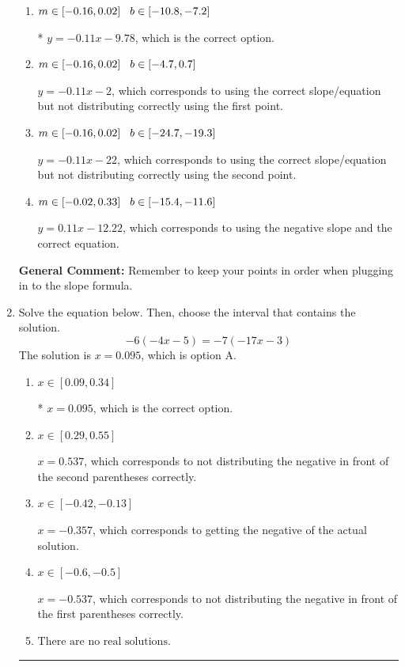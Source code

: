 \documentclass{extbook}[14pt]
\newcommand{\litem}[1]{\item #1

\rule{\textwidth}{0.4pt}}
\begin{document}
\begin{enumerate}
{\begin{enumerate}[label=\Alph*.]
 $y = -0.11x + 9.78$, which corresponds to using the correct slope and getting the negative y-intercept.
\item \( m \in [-0.16, 0.02] \hspace*{3mm} b \in [-10.8, -7.2] \)

* $y = -0.11x -9.78$, which is the correct option.
\item \( m \in [-0.16, 0.02] \hspace*{3mm} b \in [-4.7, 0.7] \)

 $y = -0.11x -2$, which corresponds to using the correct slope/equation but not distributing correctly using the first point.
\item \( m \in [-0.16, 0.02] \hspace*{3mm} b \in [-24.7, -19.3] \)

 $y = -0.11x -22$, which corresponds to using the correct slope/equation but not distributing correctly using the second point.
\item \( m \in [-0.02, 0.33] \hspace*{3mm} b \in [-15.4, -11.6] \)

 $y = 0.11x -12.22$, which corresponds to using the negative slope and the correct equation.
\end{enumerate}

\textbf{General Comment:} Remember to keep your points in order when plugging in to the slope formula.
}
\litem{
Solve the equation below. Then, choose the interval that contains the solution.
\[ -6(-4x -5) = -7(-17x -3) \]The solution is \( x = 0.095 \), which is option A.\begin{enumerate}[label=\Alph*.]
\item \( x \in [0.09, 0.34] \)

* $x = 0.095$, which is the correct option.
\item \( x \in [0.29, 0.55] \)

$x = 0.537$, which corresponds to not distributing the negative in front of the second parentheses correctly.
\item \( x \in [-0.42, -0.13] \)

$x = -0.357$, which corresponds to getting the negative of the actual solution.
\item \( x \in [-0.6, -0.5] \)

$x = -0.537$, which corresponds to not distributing the negative in front of the first parentheses correctly.
\item \( \text{There are no real solutions.} \)


\end{enumerate}}
\end{enumerate}
\end{document}
